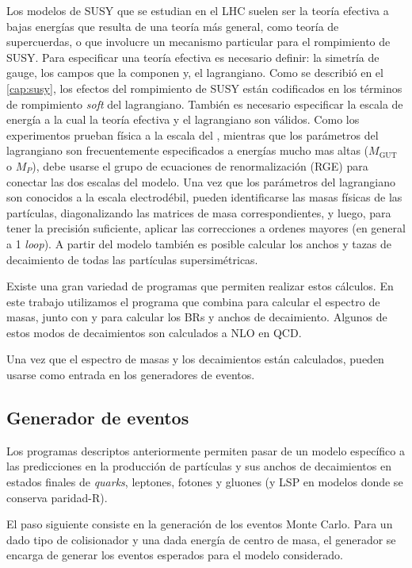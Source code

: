 Los modelos de SUSY que se estudian en el LHC suelen ser la teoría efectiva a
bajas energías que resulta de una teoría más general, como teoría de
supercuerdas, o que involucre un mecanismo particular para el rompimiento de
SUSY. Para especificar una teoría efectiva es necesario definir: la simetría de
gauge, los campos que la componen y, el lagrangiano. Como se describió en el
\cref{cap:susy}, los efectos del rompimiento de SUSY están codificados en los
términos de rompimiento \emph{soft} del lagrangiano. También es necesario especificar
la escala de energía a la cual la teoría efectiva y el lagrangiano son válidos.
Como los experimentos prueban física a la escala del {\tev}, mientras que los
parámetros del lagrangiano son frecuentemente especificados a energías mucho mas
altas ($M_\text{GUT}$ o $M_P$), debe usarse el grupo de ecuaciones de
renormalización (RGE) para conectar las dos escalas del modelo. Una vez que los
parámetros del lagrangiano son conocidos a la escala electrodébil, pueden
identificarse las masas físicas de las partículas, diagonalizando las matrices
de masa correspondientes, y luego, para tener la precisión suficiente, aplicar
las correcciones a ordenes mayores (en general a 1 \emph{loop}). A partir del modelo
también es posible calcular los anchos y tazas de decaimiento de todas las
partículas supersimétricas.

Existe una gran variedad de programas que permiten realizar estos cálculos. En
este trabajo utilizamos el programa {\susyhit}\cite{Djouadi:2006bz} que combina
{\suspect}\cite{Djouadi2007426} para calcular el espectro de masas, junto con
{\sdecay}\cite{Muhlleitner:2004mka} y {\hdecay}\cite{Djouadi:1997yw} para
calcular los BRs y anchos de decaimiento. Algunos de estos modos de decaimientos
son calculados a NLO en QCD.

Una vez que el espectro de masas y los decaimientos están calculados,
pueden usarse como entrada en los generadores de eventos.


\subsection{Generador de eventos}

Los programas descriptos anteriormente permiten pasar de un modelo específico a las
predicciones en la producción de partículas y sus anchos de decaimientos en
estados finales de \emph{quarks}, leptones, fotones y gluones (y LSP en modelos donde
se conserva paridad-R).

El paso siguiente consiste en la generación de los eventos Monte Carlo.
Para un dado tipo de colisionador y una dada energía de centro de masa,
el generador se encarga de generar los eventos esperados para el modelo
considerado.

